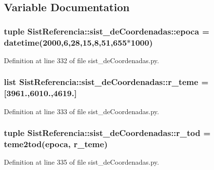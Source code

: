 \subsection{\-Variable \-Documentation}
\subsubsection[{epoca}]{\setlength{\rightskip}{0pt plus 5cm}tuple {\bf \-Sist\-Referencia\-::sist\-\_\-de\-Coordenadas\-::epoca} = datetime(2000,6,28,15,8,51,655$\ast$1000)}\label{namespace_sist_referencia_1_1sist__de_coordenadas_a5b1ef879add4bc0afc576033b8c65bf9}


\-Definition at line 332 of file sist\-\_\-de\-Coordenadas.\-py.

\subsubsection[{r\-\_\-teme}]{\setlength{\rightskip}{0pt plus 5cm}list {\bf \-Sist\-Referencia\-::sist\-\_\-de\-Coordenadas\-::r\-\_\-teme} = [3961.,6010.,4619.]}\label{namespace_sist_referencia_1_1sist__de_coordenadas_afff457861437508005c437a8ca938e69}


\-Definition at line 333 of file sist\-\_\-de\-Coordenadas.\-py.

\subsubsection[{r\-\_\-tod}]{\setlength{\rightskip}{0pt plus 5cm}tuple {\bf \-Sist\-Referencia\-::sist\-\_\-de\-Coordenadas\-::r\-\_\-tod} = {\bf teme2tod}({\bf epoca}, {\bf r\-\_\-teme})}\label{namespace_sist_referencia_1_1sist__de_coordenadas_a62aae6ec02c7834cb0f5b4aeafb763e3}


\-Definition at line 335 of file sist\-\_\-de\-Coordenadas.\-py.

